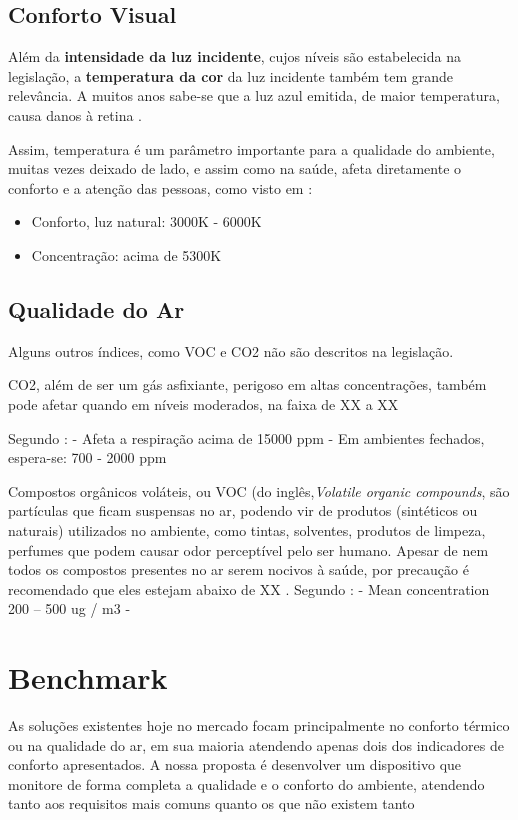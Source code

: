 \documentclass[]{politex}
\begin{document}
\section{Conforto Visual} %
Além da \textbf{intensidade da luz incidente}, cujos níveis são estabelecida na legislação, a \textbf{temperatura da cor} da luz incidente também tem grande relevância. A muitos anos sabe-se que a luz azul emitida, de maior temperatura, causa danos à retina \cite{BlueLight}. \par
Assim, temperatura é um parâmetro importante para a qualidade do ambiente, muitas vezes deixado de lado, e assim como na saúde, afeta diretamente o conforto e a atenção das pessoas, como visto em \cite{VisualComfort}: 
\begin{itemize}
\item Conforto, luz natural: 3000K - 6000K
\item Concentração: acima de 5300K 
\end{itemize}

\section{Qualidade do Ar}
Alguns outros índices, como VOC e CO2 não são descritos na legislação. 

CO2, além de ser um gás asfixiante, perigoso em altas concentrações, também pode afetar quando em níveis moderados, na faixa de XX a XX

Segundo \cite{AirQuality}: 
- Afeta a respiração acima de 15000 ppm
- Em ambientes fechados, espera-se: 700 - 2000 ppm 

Compostos orgânicos voláteis, ou VOC (do inglês,\textit{Volatile organic compounds}, são partículas que ficam suspensas no ar, podendo vir de produtos (sintéticos ou naturais) utilizados no ambiente, como tintas, solventes, produtos de limpeza, perfumes que podem causar odor perceptível pelo ser humano\cite{AirQuality}.
Apesar de nem todos os compostos presentes no ar serem nocivos à saúde, por precaução é recomendado que eles estejam abaixo de XX \cite{}. 
Segundo \cite{AirQuality}: 
- Mean concentration  200 – 500 ug / m3
- 

\chapter{Benchmark} %

As soluções existentes hoje no mercado focam principalmente no conforto térmico ou na qualidade do ar, em sua maioria atendendo apenas dois dos indicadores de conforto apresentados. A nossa proposta é desenvolver um dispositivo que monitore de forma completa a qualidade e o conforto do ambiente, atendendo tanto aos requisitos mais comuns quanto os que não existem tanto
\end{document}
